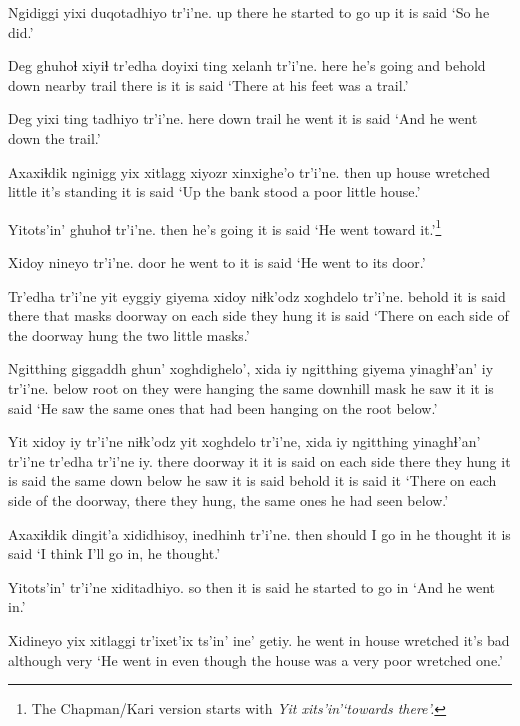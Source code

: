 \documentclass[12pt]{article}
\begin{document}
\gll Ngidiggi yixi duqotadhiyo tr'i'ne.
up there {he started to go up} {it is said}
\glt `So he did.'
\glend

\gll Deg ghuhoɬ xiyiɬ tr'edha doyixi  ting xelanh tr'i'ne.
here {he's going} and behold {down nearby} trail {there is} {it is said}
\glt `There at his feet was a trail.'
\glend

\gll Deg yixi ting tadhiyo tr'i'ne.
here down trail {he went} {it is said}
\glt `And he went down the trail.'
\glend

\gll Axaxiɬdik nginigg yix xitlagg xiyozr xinxighe'o tr'i'ne.
then  up  house wretched little {it's standing} {it is said}
\glt `Up the bank stood a poor little house.'
\glend

\gll Yitots'in' ghuhoɬ tr'i'ne.
then {he's going} {it is said}
\glt `He went toward it.'\footnote{The Chapman/Kari version starts with \em Yit xits'in'\em `towards there'.}
\glend

\gll Xidoy nineyo tr'i'ne.
door {he went to} {it is said}
\glt `He went to its door.'
\glend

\gll Tr'edha tr'i'ne yit eyggiy giyema xidoy niɬk'odz xoghdelo tr'i'ne.
behold  {it is said} there that masks doorway {on each side} {they hung} {it is said} 
\glt `There on each side of the doorway hung the two little masks.'
\glend

\gll Ngitthing giggaddh ghun' xoghdighelo', {xida iy} ngitthing giyema yinaghɬ'an' iy tr'i'ne.
below  root  on {they were hanging} {the same} downhill mask {he saw} it {it is said}
\glt `He saw the same ones that had been hanging on the root below.'
\glend

\gll Yit xidoy  iy tr'i'ne niɬk'odz yit xoghdelo tr'i'ne, {xida iy} ngitthing yinaghɬ'an' tr'i'ne tr'edha tr'i'ne iy.
there doorway it {it is said} {on each side} there {they hung} {it is said} {the same} {down below} {he saw} {it is said} behold  {it is said} it
\glt `There on each side of the doorway, there they hung, the same ones he had seen below.'
\glend

\gll Axaxiɬdik dingit'a xididhisoy, inedhinh tr'i'ne.
then  should {I go in} {he thought} {it is said}
\glt `I think I'll go in, he thought.'
\glend

\gll Yitots'in' tr'i'ne xiditadhiyo.
{so then}  {it is said} {he started to go in}
\glt `And he went in.'
\glend

\gll Xidineyo yix xitlaggi  tr'ixet'ix ts'in'  ine' getiy.
{he went in} house wretched {it's bad} {} although very
\glt `He went in even though the house was a very poor wretched one.'
\glend
\end{document}
